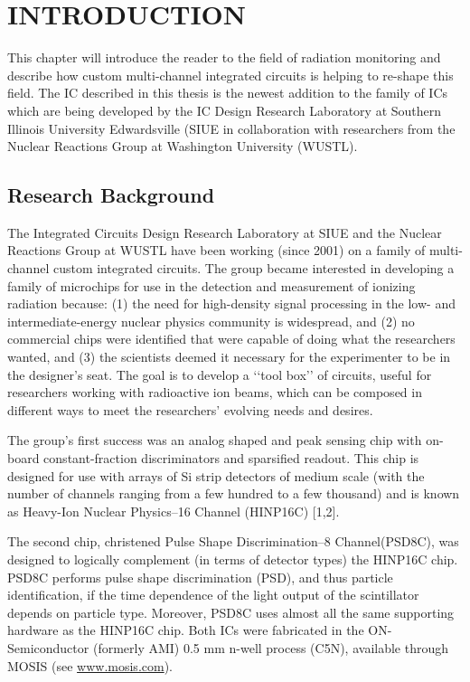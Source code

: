 \documentclass[12pt,oneside,final]{siuethesis}
\theoremstyle{definition}
\begin{document}

\chapter{INTRODUCTION}  %

This chapter will introduce the reader to the field of radiation monitoring and describe how custom multi-channel integrated circuits is helping to re-shape this field.  The IC described in this thesis is the newest addition to the family of ICs which are being developed by the IC Design Research Laboratory at Southern Illinois University Edwardsville (SIUE in collaboration with researchers from the Nuclear Reactions Group at Washington University (WUSTL).

\section{Research Background}

The Integrated Circuits Design Research Laboratory at SIUE and the Nuclear Reactions Group at WUSTL have been working (since 2001) on a family of multi-channel custom integrated circuits.  The group became interested in developing a family of microchips for use in the detection and measurement of ionizing radiation because: (1) the need for high-density signal processing in the low- and intermediate-energy nuclear physics community is widespread, and (2) no commercial chips were identified that were capable of doing what the researchers wanted, and (3) the scientists deemed it necessary for the experimenter to be in the designer’s seat. The goal is to develop a ‘‘tool box’’ of circuits,
useful for researchers working with radioactive ion beams, which can be composed in different ways to meet the researchers’ evolving needs and desires.

 
The group’s first success was an analog shaped and peak sensing chip with on-board constant-fraction discriminators and
sparsified readout. This chip is designed for use with arrays of Si strip detectors of medium scale (with the number of channels ranging from a few hundred to a few thousand) and is known as Heavy-Ion Nuclear Physics–16 Channel (HINP16C) [1,2]. 

The second chip, christened Pulse Shape Discrimination–8 Channel(PSD8C), was designed to logically complement (in terms of detector types) the HINP16C chip. PSD8C performs pulse shape discrimination (PSD), and thus particle identification, if the time dependence of the light output of the scintillator depends on particle type. Moreover, PSD8C uses almost all the same supporting hardware as the HINP16C chip. Both ICs were fabricated in the ON-Semiconductor (formerly AMI) 0.5 mm n-well process (C5N), available through MOSIS (see \url{www.mosis.com}).
\end{document}
